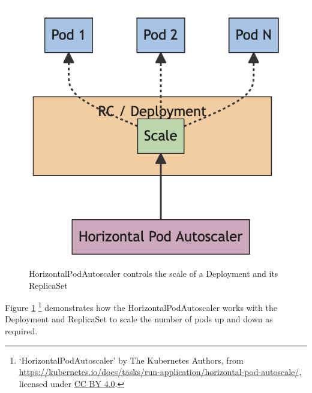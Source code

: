 \begin{figure}[htbp]
\includegraphics[width=12cm]{horizontalpodscaling.png}
\centering
\caption{HorizontalPodAutoscaler controls the scale of a Deployment and its ReplicaSet}
\label{fig:horizontalpodscaling}
\end{figure}

Figure \ref{fig:horizontalpodscaling} \footnote{`HorizontalPodAutoscaler' by The Kubernetes Authors, from \url{https://kubernetes.io/docs/tasks/run-application/horizontal-pod-autoscale/}, licensed under \href{https://creativecommons.org/licenses/by/4.0/}{CC BY 4.0}.} demonstrates how the HorizontalPodAutoscaler works with the Deployment and ReplicaSet to scale the number of pods up and down as required.
